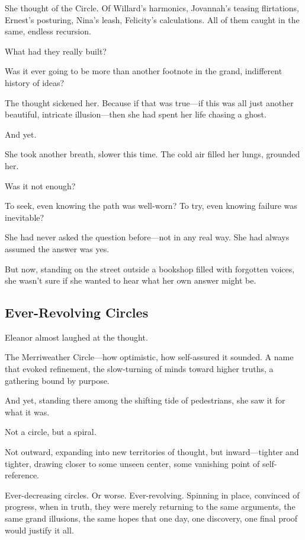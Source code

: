 She thought of the Circle. Of Willard’s harmonics, Jovannah’s teasing flirtations, Ernest’s posturing, Nina’s leash, Felicity’s calculations. All of them caught in the same, endless recursion.

What had they really built?

Was it ever going to be more than another footnote in the grand, indifferent history of ideas?

The thought sickened her. Because if that was true—if this was all just another beautiful, intricate illusion—then she had spent her life chasing a ghost.

And yet.

She took another breath, slower this time. The cold air filled her lungs, grounded her.

Was it not enough?

To seek, even knowing the path was well-worn? To try, even knowing failure was inevitable?

She had never asked the question before—not in any real way. She had always assumed the answer was yes.

But now, standing on the street outside a bookshop filled with forgotten voices, she wasn’t sure if she wanted to hear what her own answer might be.

\subsection*{Ever-Revolving Circles}

Eleanor almost laughed at the thought.

\smallskip

The Merriweather Circle—how optimistic, how self-assured it sounded. A name that evoked refinement, the slow-turning of minds toward higher truths, a gathering bound by purpose.

And yet, standing there among the shifting tide of pedestrians, she saw it for what it was.

Not a circle, but a spiral.

Not outward, expanding into new territories of thought, but inward—tighter and tighter, drawing closer to some unseen center, some vanishing point of self-reference.

Ever-decreasing circles. Or worse. Ever-revolving. Spinning in place, convinced of progress, when in truth, they were merely returning to the same arguments, the same grand illusions, the same hopes that one day, one discovery, one final proof would justify it all.

